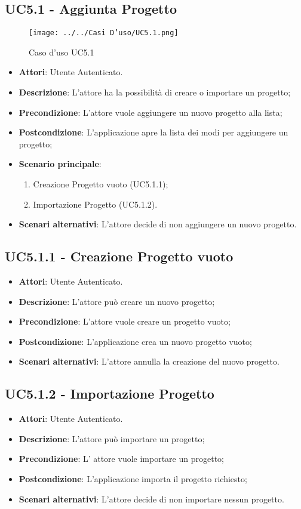 \subsection{UC5.1 - Aggiunta Progetto} 
\label{ssec:UC5.1} 
\begin{figure}[h!] 
\centering 
\texttt{[image: ../../Casi D'uso/UC5.1.png]} 
\caption{Caso d'uso UC5.1} 
 \end{figure} 
\begin{itemize} 
\item \textbf{Attori}: Utente Autenticato.
\item \textbf{Descrizione}: L’attore ha la possibilità di creare o importare un progetto;
\item \textbf{Precondizione}: L’attore vuole aggiungere un nuovo progetto alla lista;
\item \textbf{Postcondizione}: L’applicazione apre la lista dei modi per aggiungere un progetto;
\item \textbf{Scenario principale}: \begin{enumerate}\item Creazione Progetto vuoto (UC5.1.1);\item Importazione Progetto (UC5.1.2). 
 \end{enumerate}
\item \textbf{Scenari alternativi}: L'attore decide di non aggiungere un nuovo progetto.
\end{itemize} 
\subsection{UC5.1.1 - Creazione Progetto vuoto} 
\label{ssec:UC5.1.1} 
\begin{itemize} 
\item \textbf{Attori}: Utente Autenticato.
\item \textbf{Descrizione}: L'attore può creare un nuovo progetto;
\item \textbf{Precondizione}: L'attore vuole creare un progetto vuoto;
\item \textbf{Postcondizione}: L'applicazione crea un nuovo progetto vuoto;
\item \textbf{Scenari alternativi}: L'attore annulla la creazione del nuovo progetto.
\end{itemize} 
\subsection{UC5.1.2 - Importazione Progetto} 
\label{ssec:UC5.1.2} 
\begin{itemize} 
\item \textbf{Attori}: Utente Autenticato.
\item \textbf{Descrizione}: L'attore può importare un progetto;
\item \textbf{Precondizione}: L' attore vuole importare un progetto;
\item \textbf{Postcondizione}: L'applicazione importa il progetto richiesto;
\item \textbf{Scenari alternativi}: L'attore decide di non importare nessun progetto.
\end{itemize} 
